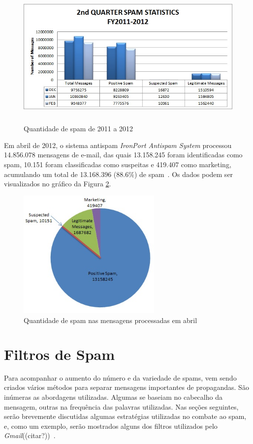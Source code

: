 \documentclass[a4paper,dvipdfm]{article}
\begin{document}
	\begin{figure}[h!]
		\centering
		\includegraphics[height=7cm]{Imagens/spam/2ndQtr-FY2011-12.jpg}
		\caption{Quantidade de spam de 2011 a 2012}
		\label{fig:spambar}
	\end{figure}
	
	Em abril de 2012, o sistema antispam \emph{IronPort Antispam System} processou 14.856.078 mensagens de e-mail, das quais 13.158.245 foram identificadas como spam, 10.151 foram classificadas como suspeitas e 419.407 como marketing, acumulando um total de 13.168.396 ($88.6\%$) de spam~\cite{spam:stats}.
	Os dados podem ser visualizados no gráfico da Figura \ref{fig:spampizza}.
	
	\begin{figure}[h!]
		\centering
		\includegraphics[width=7cm]{Imagens/spam/Apr2012-Spam.jpg}
		\caption{Quantidade de spam nas mensagens processadas em abril}
		\label{fig:spampizza}
	\end{figure}
	
	
	
\newpage
\section{Filtros de Spam}
	Para acompanhar o aumento do número e da variedade de spams, vem sendo criados vários métodos para separar mensagens importantes de propagandas.
	São inúmeras as abordagens utilizadas. 
	Algumas se baseiam no \gls{cabecalho} da mensagem, outras na frequência das palavras utilizadas.
	Nas seções seguintes, serão brevemente discutidas algumas estratégias utilizadas no combate ao spam, e, como um exemplo, serão mostrados alguns dos filtros utilizados pelo \emph{Gmail}((citar?))~\cite{filtros, gmail:youtube, gmail:fightspam}.
\end{document}
